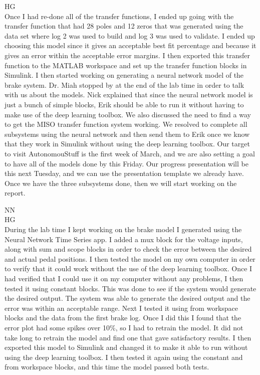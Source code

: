 \documentclass[fontsize=11pt, %
                             paper=letter, %
                             openany, %
                             captions=tableheading,
                             index=totoc,
                             hyperref]{labbook}
\def\currentYear{2021}
\begin{document}
\begin{addmargin}[0cm]{0cm}
HG\\
Once I had re-done all of the transfer functions, I ended up going with the transfer function that had 28 poles and 12 zeros that was generated using the data set where log 2 was used to build and log 3 was used to validate. I ended up choosing this model since it gives an acceptable best fit percentage and because it gives an error within the acceptable error margins. I then exported this transfer function to the MATLAB workspace and set up the transfer function blocks in Simulink. I then started working on generating a neural network model of the brake system. Dr. Miah stopped by at the end of the lab time in order to talk with us about the models. Nick explained that since the neural network model is just a bunch of simple blocks, Erik should be able to run it without having to make use of the deep learning toolbox. We also discussed the need to find a way to get the MISO transfer function system working. We resolved to complete all subsystems using the neural network and then send them to Erik once we know that they work in Simulink without using the deep learning toolbox. Our target to visit AutonomouStuff is the first week of March, and we are also setting a goal to have all of the models done by this Friday. Our progress presentation will be this next Tuesday, and we can use the presentation template we already have. Once we have the three subsystems done, then we will start working on the report. 


\labday{Monday, February 28, \currentYear}
NN\\

HG\\
During the lab time I kept working on the brake model I generated using the Neural Network Time Series app. I added a mux block for the voltage inputs, along with sum and scope blocks in order to check the error between the desired and actual pedal positions. I then tested the model on my own computer in order to verify that it could work without the use of the deep learning toolbox. Once I had verified that I could use it on my computer without any problems, I then tested it using constant blocks. This was done to see if the system would generate the desired output. The system was able to generate the desired output and the error was within an acceptable range. Next I tested it using from workspace blocks and the data from the first brake log. Once I did this I found that the error plot had some spikes over 10\%, so I had to retrain the model. It did not take long to retrain the model and find one that gave satisfactory results. I then exported this model to Simulink and changed it to make it able to run without using the deep learning toolbox. I then tested it again using the constant and from workspace blocks, and this time the model passed both tests. 


\end{addmargin}
\end{document}
